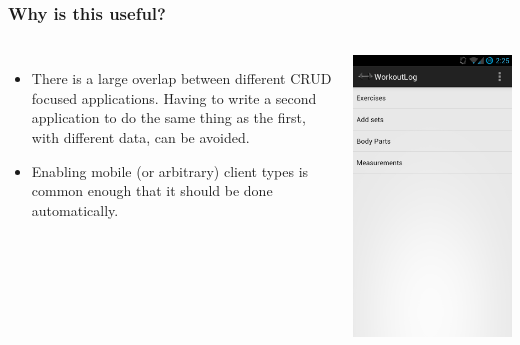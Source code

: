 \documentclass[]{beamer}
\begin{document}
\begin{frame}
\frametitle{Why is this useful?}


\begin{columns}[c]
\column{2in}

\begin{itemize}
\item There is a large overlap between different CRUD focused applications. Having to write a second application to do the same thing as the first, with different data, can be avoided.
\item Enabling mobile (or arbitrary) client types is common enough that it should be done automatically.
\end{itemize}

\column{1in}
\includegraphics[width=\linewidth]{images/workout.png}

\end{columns}
\end{frame}
\end{document}
